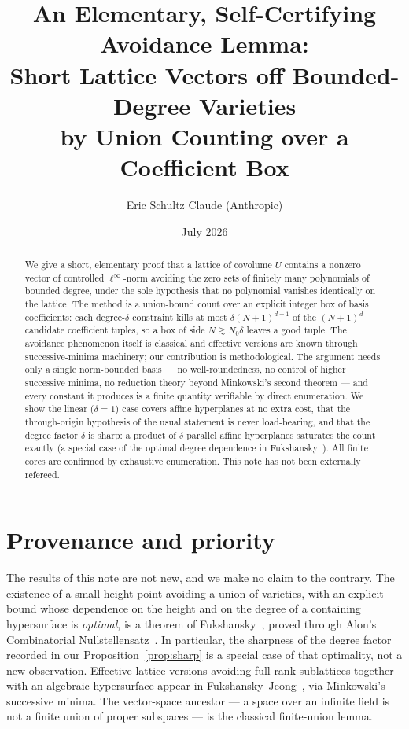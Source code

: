 \documentclass[11pt]{article}
\title{An Elementary, Self-Certifying Avoidance Lemma:\\
Short Lattice Vectors off Bounded-Degree Varieties\\
by Union Counting over a Coefficient Box}
\author{Eric Schultz \qquad Claude (Anthropic)}
\date{July 2026}
\theoremstyle{definition}
\begin{document}
\maketitle

\begin{abstract}
We give a short, elementary proof that a lattice of covolume $U$ contains a nonzero
vector of controlled $\ell^\infty$-norm avoiding the zero sets of finitely many
polynomials of bounded degree, under the sole hypothesis that no polynomial vanishes
identically on the lattice. The method is a union-bound count over an explicit
integer box of basis coefficients: each degree-$\delta$ constraint kills at most
$\delta(N+1)^{d-1}$ of the $(N+1)^d$ candidate coefficient tuples, so a box of side
$N \gtrsim N_0\delta$ leaves a good tuple. The avoidance phenomenon itself is classical
and effective versions are known through successive-minima machinery; our contribution
is methodological. The argument needs only a single norm-bounded basis --- no
well-roundedness, no control of higher successive minima, no reduction theory beyond
Minkowski's second theorem --- and every constant it produces is a finite quantity
verifiable by direct enumeration. We show the linear ($\delta=1$) case covers affine
hyperplanes at no extra cost, that the through-origin hypothesis of the usual statement
is never load-bearing, and that the degree factor $\delta$ is sharp: a product of
$\delta$ parallel affine hyperplanes saturates the count exactly (a special case of the
optimal degree dependence in Fukshansky~\cite{fuk2010}). All finite cores are
confirmed by exhaustive enumeration. This note has not been externally refereed.
\end{abstract}

\section*{Provenance and priority}
The results of this note are not new, and we make no claim to the contrary. The
existence of a small-height point avoiding a union of varieties, with an explicit
bound whose dependence on the height and on the degree of a containing hypersurface
is \emph{optimal}, is a theorem of Fukshansky~\cite{fuk2010}, proved through Alon's
Combinatorial Nullstellensatz~\cite{alon}. In particular, the sharpness of the degree
factor recorded in our Proposition~\ref{prop:sharp} is a special case of that
optimality, not a new observation. Effective lattice versions avoiding full-rank
sublattices together with an algebraic hypersurface appear in
Fukshansky--Jeong~\cite{fukjeong}, via Minkowski's successive minima. The
vector-space ancestor --- a space over an infinite field is not a finite union of
proper subspaces --- is the classical finite-union lemma.
\end{document}
